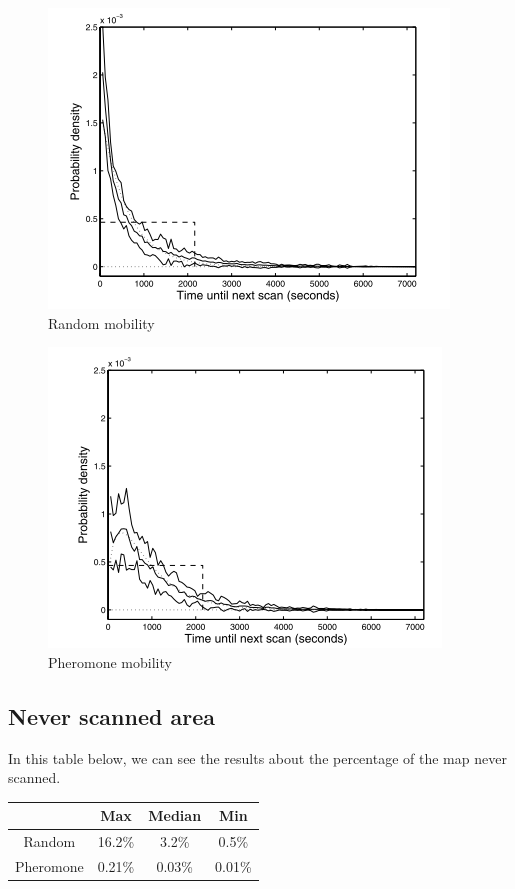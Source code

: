 \begin{figure}[!h]
\centering
   \includegraphics{../images/random_scan_characteristic.png}
\caption{\label{randomchar} Random mobility\cite{UAV}}
\end{figure}

\begin{figure}[!h]
   \centering
   \includegraphics{../images/pheromone_scan_characteristic.png}
\caption{\label{pheromonechar} Pheromone mobility\cite{UAV}}
\end{figure}

\subsection{Never scanned area}

In this table below, we can see the results about the percentage of the map never scanned.\\

\begin{center}
\begin{tabular}{|c|c|c|c|}
\hline
	      & Max & Median & Min \\
	      \hline
	Random & 16.2\% & 3.2\% & 0.5\% \\
	\hline
	Pheromone & 0.21\% & 0.03\% & 0.01\% \\
	\hline
\end{tabular}
\end{center}

